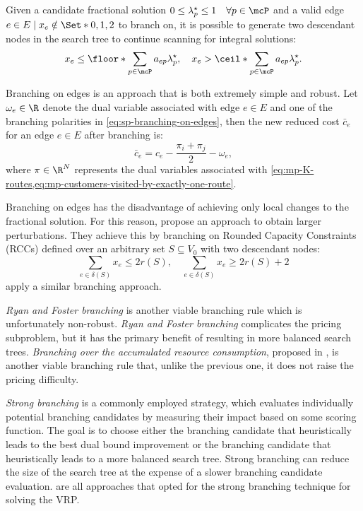 Given a candidate fractional solution $0 \le \lambda^\star_p \le 1 \quad \forall p \in \mcP$
and a valid edge $e \in E \mid x_e \notin \Set*{0, 1, 2}$ to branch on,
it is possible to generate two descendant nodes in the search tree
to continue scanning for integral solutions:
\begin{equation}\label{eq:sp-branching-on-edges}
	x_e \le \floor*{\sum_{p \in \mcP} a_{ep} \lambda^\star_p}, \quad
	x_e > \ceil*{\sum_{p \in \mcP} a_{ep} \lambda^\star_p}.
\end{equation}

Branching on edges is an approach that is both extremely simple and robust.
Let $\omega_e \in \R$ denote the dual variable associated with edge $e \in E$
and one of the branching polarities in \cref{eq:sp-branching-on-edges},
then the new reduced cost $\bar{c}_e$ for an edge $e \in E$ after branching is:
\begin{equation}
	\bar{c}_e = c_e - \frac{\pi_i + \pi_j}{2} - \omega_e,
\end{equation}
where $\pi \in \R^N$ represents the dual variables associated with
\cref{eq:mp-K-routes,eq:mp-customers-visited-by-exactly-one-route}.

Branching on edges has the disadvantage of achieving only local changes
to the fractional solution.
For this reason, \textcite{augerat1998} propose an
approach to obtain larger perturbations.
They achieve this by branching on Rounded Capacity Constraints (RCCs) defined over
an arbitrary set $S \subseteq V_0$ with two descendant nodes:
\begin{equation}\label{eq:sp-branching-on-cutsets}
	\sum_{e \in \delta(S)}x_e \le 2 r(S), \quad
	\sum_{e \in \delta(S)}x_e \ge 2 r(S) + 2
\end{equation}
\textcite{pecin2017improved} apply a similar branching approach.

\textit{Ryan and Foster branching} \parencite{ryan1981integer}
is another viable branching rule which is unfortunately non-robust.
\textit{Ryan and Foster branching} complicates the pricing subproblem,
but it has the primary benefit of resulting in more balanced search trees.
\textit{Branching over the accumulated resource consumption}, proposed in \textcite{gelinas1995new},
is another viable branching rule that,
unlike the previous one, it does not raise the pricing difficulty.

\textit{Strong branching} is a commonly employed strategy,
which evaluates individually potential branching candidates
by measuring their impact based on some scoring function.
The goal is to choose either the branching candidate
that heuristically leads to the best dual bound improvement
or the branching candidate that heuristically leads to a more balanced search tree.
Strong branching can reduce the size of the search tree
at the expense of a slower branching candidate evaluation.
\textcite{fukasawa2006, pecin2017limited, pecin2017new} are all approaches
that opted for the strong branching technique for solving the VRP.

